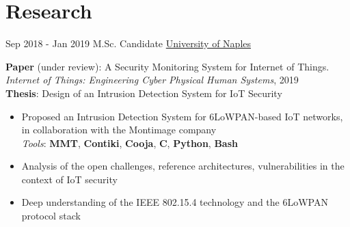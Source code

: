 \documentclass[letterpaper]{twentysecondcv} %
\begin{document}
\section{Research}
\begin{twenty}
	\twentyitem
    	{Sep 2018 -}
		{Jan 2019}
        {M.Sc. Candidate}
        {\href{http://www.scuolapsb.unina.it/}{University of Naples}}
        {}
        {
       	\textbf{Paper} (under review): A Security Monitoring System for Internet of Things.  \textit{Internet of Things: Engineering Cyber Physical Human Systems}, 2019 \\
       	\textbf{Thesis}: Design of an Intrusion Detection System for IoT Security
        {
            \begin{itemize}
                \item Proposed an Intrusion Detection System for 6LoWPAN-based IoT networks, in collaboration with the Montimage company\\
                \textit{Tools}: \textbf{MMT}, \textbf{Contiki}, \textbf{Cooja}, \textbf{C}, \textbf{Python}, \textbf{Bash}
                \item Analysis of the open challenges, reference architectures, vulnerabilities in the context of IoT security
                \item Deep understanding of the IEEE 802.15.4 technology and the 6LoWPAN protocol stack
		    \end{itemize}}
        }
\end{twenty}
%
%
\end{document}
